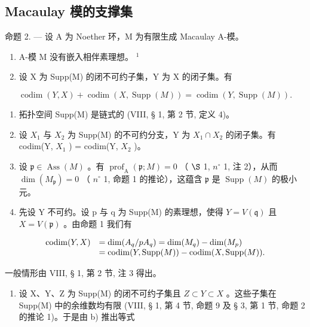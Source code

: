 \subsection{Macaulay 模的支撑集}

命题 2. — 设 A 为 Noether 环，M 为有限生成 Macaulay A-模。

\begin{enumerate}
\def\labelenumi{\alph{enumi})}
\item
  A-模 M 没有嵌入相伴素理想。 \(^{1}\)
\item
  设 X 为 Supp(M) 的闭不可约子集，Y 为 X 的闭子集。有
\end{enumerate}

\[
\operatorname{codim} (Y, X) + \operatorname{codim} (X, \operatorname{Supp} (M)) = \operatorname{codim} (Y, \operatorname{Supp} (M)).
\]

\begin{enumerate}
\def\labelenumi{\alph{enumi})}
\setcounter{enumi}{2}
\item
  拓扑空间 Supp(M) 是链式的 (VIII, § 1, 第 2 节, 定义 4)。
\item
  设 \(X_{1}\) 与 \(X_{2}\) 为 Supp(M) 的不可约分支，Y 为 \(X_{1} \cap X_{2}\) 的闭子集。有 codim(Y, \(X_{1}\) ) = codim(Y, \(X_{2}\) )。
\item
  设 \(\mathfrak{p} \in \operatorname{Ass}(M)\) 。有 \(\operatorname{prof}_{\mathrm{A}}(\mathfrak{p}; M) = 0\) （ \(\S\) 1, \(n^{\circ}\) 1, 注 2），从而 \(\dim(M_{\mathfrak{p}}) = 0\) （ \(n^{\circ}\) 1, 命题 1 的推论），这蕴含 \(\mathfrak{p}\) 是 \(\operatorname{Supp}(M)\) 的极小元。
\item
  先设 Y 不可约。设 p 与 q 为 Supp(M) 的素理想，使得 \(Y = V(\mathfrak{q})\) 且 \(X = V(\mathfrak{p})\) 。由命题 1 我们有
\end{enumerate}

\[
\begin{array}{r l} \operatorname{codim} (Y, X) & = \dim (A _ {q} / p A _ {q}) = \dim (M _ {q}) - \dim (M _ {p}) \\ & = \operatorname{codim} (Y, \operatorname{Supp} (M)) - \operatorname{codim} (X, \operatorname{Supp} (M)). \end{array}
\]

一般情形由 VIII, § 1, 第 2 节, 注 3 得出。

\begin{enumerate}
\def\labelenumi{\alph{enumi})}
\setcounter{enumi}{2}
\tightlist
\item
  设 X、Y、Z 为 Supp(M) 的闭不可约子集且 \(Z \subset Y \subset X\) 。这些子集在 Supp(M) 中的余维数均有限 (VIII, § 1, 第 4 节, 命题 9 及 § 3, 第 1 节, 命题 2 的推论 1)。于是由 b) 推出等式
\end{enumerate}

